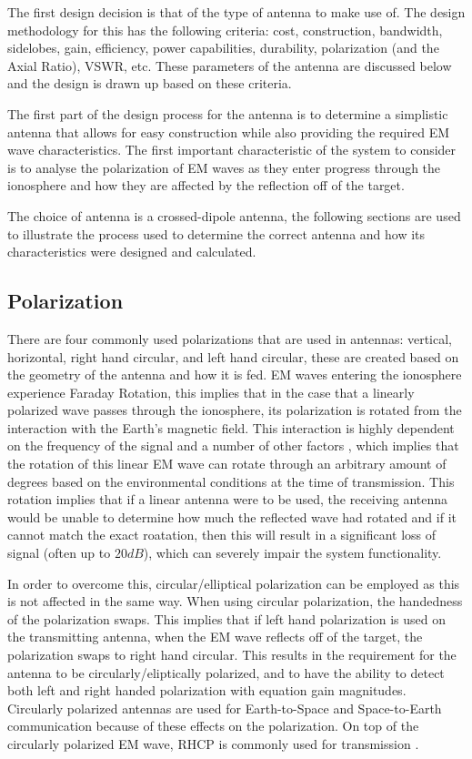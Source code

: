 \documentclass[11pt]{witseiepaper}
\begin{document}
The first design decision is that of the type of antenna to make use of. The design methodology for this has the following criteria: cost, construction, bandwidth, sidelobes, gain, efficiency, power capabilities, durability, polarization (and the Axial Ratio), VSWR, etc. 
These parameters of the antenna are discussed below and the design is drawn up based on these criteria.

The first part of the design process for the antenna is to determine a simplistic antenna that allows for easy construction while also providing the required EM wave characteristics.
The first important characteristic of the system to consider is to analyse the polarization of EM waves as they enter progress through the ionosphere and how they are affected by the reflection off of the target.

The choice of antenna is a crossed-dipole antenna, the following sections are used to illustrate the process used to determine the correct antenna and how its characteristics were designed and calculated.

\subsection{Polarization} \label{sec:Polarization}
There are four commonly used polarizations that are used in antennas: vertical, horizontal, right hand circular, and left hand circular, these are created based on the geometry of the antenna and how it is fed.
EM waves entering the ionosphere experience Faraday Rotation, this implies that in the case that a linearly polarized wave passes through the ionosphere, its polarization is rotated from the interaction with the Earth's magnetic field. This interaction is highly dependent on the frequency of the signal and a number of other factors \cite[p.~24]{faradayRotationSlides}, which implies that the rotation of this linear EM wave can rotate through an arbitrary amount of degrees based on the environmental conditions at the time of transmission. This rotation implies that if a linear antenna were to be used, the receiving antenna would be unable to determine how much the reflected wave had rotated and if it cannot match the exact roatation, then this will result in a significant loss of signal (often up to $20 dB$), which can severely impair the system functionality.

In order to overcome this, circular/elliptical polarization can be employed as this is not affected in the same way.
When using circular polarization, the handedness of the polarization swaps. This implies that if left hand polarization is used on the transmitting antenna, when the EM wave reflects off of the target, the polarization swaps to right hand circular.
This results in the requirement for the antenna to be circularly/eliptically polarized, and to have the ability to detect both left and right handed polarization with equation gain magnitudes.
Circularly polarized antennas are used for Earth-to-Space and Space-to-Earth communication because of these effects on the polarization. On top of the circularly polarized EM wave, RHCP is commonly used for transmission \cite[p.~31]{crossedDipoleDesign}.
\end{document}
